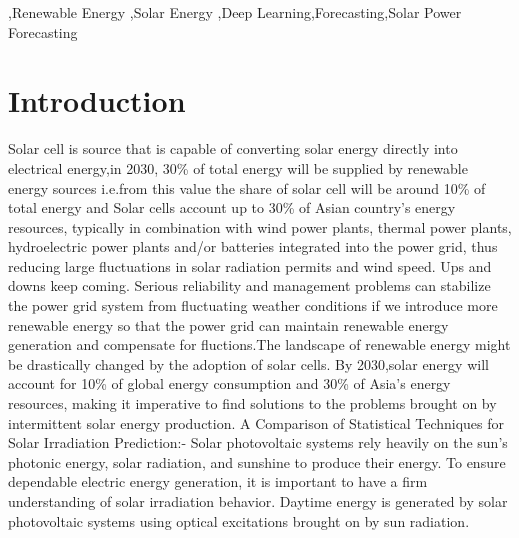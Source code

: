 \documentclass[a4paper,fleqn]{cas-sc}
\begin{document}

\begin{highlights}
\item 
\item 
\item 
\end{highlights}

\begin{keywords}
 \sep Renewable Energy \sep Solar Energy \sep Deep Learning\sep Forecasting\sep Solar Power Forecasting
\end{keywords}

\maketitle

\section{Introduction}Solar cell is source that is capable of converting solar energy directly into electrical energy,in 2030, 30\% of total energy will be supplied by renewable energy sources i.e.from this value the share of solar cell will be around 10\% of total energy and Solar cells account up to 30\% of Asian country’s energy resources, typically in combination with wind power plants, thermal power plants, hydroelectric power plants and/or batteries integrated into the power grid, thus reducing large fluctuations in solar radiation permits and wind speed. Ups and downs keep coming. Serious reliability and management problems can stabilize the power grid system from fluctuating weather conditions if we introduce more renewable energy so that the power grid can maintain renewable energy generation and compensate for fluctions.The landscape of renewable energy might be drastically changed by the adoption of solar cells. By 2030,solar energy will account for 10\% of global energy consumption and 30\% of Asia’s energy resources, making it imperative to find solutions to the problems brought on by intermittent solar energy production\cite{rai2022robust}.
A Comparison of Statistical Techniques for Solar Irradiation Prediction:- Solar photovoltaic systems rely heavily on the sun’s photonic energy, solar radiation, and sunshine to produce their energy. To ensure dependable electric energy generation, it is important to have a firm understanding of solar irradiation behavior. Daytime energy is generated by solar photovoltaic systems using optical excitations brought on by sun radiation.\cite{brahma2020solar}
\end{document}
